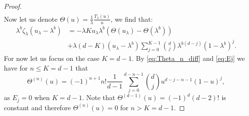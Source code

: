 \documentclass[12pt]{report}
\begin{document}
\begin{proof}
\begin{align*}
\end{align*}
Now let us denote $\Theta(u) = \frac{1}{\lambda} \frac{T_\lambda(u)}{u}$, we find that:
\begin{align}
\lambda^b \zeta_\lambda\left(u_\lambda-\lambda^b\right)
&= -\lambda K u_\lambda \lambda^b (\Theta(u_\lambda) - \Theta(\lambda^b))\\
& + \lambda (d-K) (u_\lambda - \lambda^b) \sum_{j=0}^{K-1} \binom{d}{j} \lambda^{b(d-j)} (1-\lambda^b)^j. \label{eq:lambzetaulamminlamb}
\end{align}
For now let us focus on the case $K=d-1$. By \eqref{eq:Theta_n_diff} and \eqref{eq:Ej} we have 
for $n \leq K = d-1$ that
\begin{equation}\label{eq:DnTheta}
\Theta^{(n)}(u)=(-1)^{n+1} n! \frac{1}{d-1} \sum_{j=0}^{d-n-1} \binom{d}{j} u^{d-j-n-1} (1-u)^j,
\end{equation}
as $E_j=0$ when $K=d-1$. Note that $\Theta^{(d-1)}(u)=(-1)^d (d-2)!$ is constant and therefore
$\Theta^{(n)}(u)=0$ for $n > K=d-1$. 


\end{proof}
\end{document}
